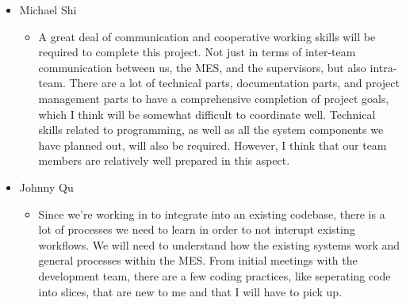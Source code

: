 \documentclass[12pt]{article}
\begin{document}
\begin{itemize}
    \item Michael Shi
      \begin{itemize}[label=$\circ$]
        \item A great deal of communication and cooperative working skills will be required to complete this project. Not just in terms of inter-team communication between us, the MES, and the supervisors, but also intra-team. There are a lot of technical parts, documentation parts, and project management parts to have a comprehensive completion of project goals, which I think will be somewhat difficult to coordinate well. Technical skills related to programming, as well as all the system components we have planned out, will also be required. However, I think that our team members are relatively well prepared in this aspect.
      \end{itemize}
    \item Johnny Qu
      \begin{itemize}[label=$\circ$]
        \item Since we're working in to integrate into an existing codebase, there is a lot of processes we need to learn in order to not interupt existing workflows. We will need to understand how the existing systems work and general processes within the MES. From initial meetings with the development team, there are a few coding practices, like seperating code into slices, that are new to me and that I will have to pick up.
      \end{itemize}
  \end{itemize}
\end{document}
